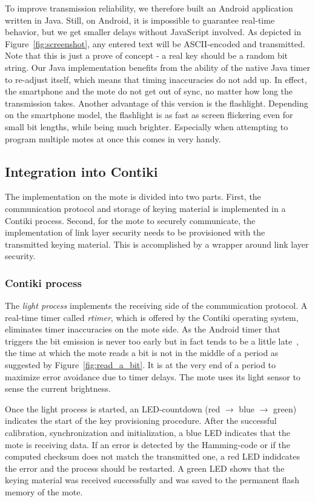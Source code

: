 \documentclass{sig-alternate} %
\begin{document}
To improve transmission reliability, we therefore built an Android application written in Java.
Still, on Android, it is impossible to guarantee real-time behavior, but we get smaller delays without JavaScript involved.
As depicted in Figure~\ref{fig:screenshot}, any entered text will be ASCII-encoded and transmitted.
Note that this is just a prove of concept - a real key should be a random bit string.
Our Java implementation benefits from the ability of the native Java timer to re-adjust itself, which means that timing inaccuracies do not add up.
In effect, the smartphone and the mote do not get out of sync, no matter how long the transmission takes.
Another advantage of this version is the flashlight.
Depending on the smartphone model, the flashlight is as fast as screen flickering even for small bit lengths, while being much brighter.
Especially when attempting to program multiple motes at once this comes in very handy.


\subsection{Integration into Contiki}
\label{sub:mote}

The implementation on the mote is divided into two parts.
First, the communication protocol and storage of keying material is implemented in a Contiki process.
Second, for the mote to securely communicate, the implementation of link layer security needs to be provisioned with the transmitted keying material.
This is accomplished by a wrapper around link layer security.

\subsubsection{Contiki process}
\label{ssub:contiki_process}

The \textit{light process} implements the receiving side of the communication protocol.
A real-time timer called \textit{rtimer}, which is offered by the Contiki operating system, eliminates timer inaccuracies on the mote side.
As the Android timer that triggers the bit emission is never too early but in fact tends to be a little late~\cite{mongia2010reliable}, the time at which the mote reads a bit is not in the middle of a period as suggested by Figure~\ref{fig:read_a_bit}.
It is at the very end of a period to maximize error avoidance due to timer delays.
The mote uses its light sensor to sense the current brightness.

Once the light process is started, an LED-countdown (red $\rightarrow$ blue $\rightarrow$ green) indicates the start of the key provisioning procedure.
After the successful calibration, synchronization and initialization, a blue LED indicates that the mote is receiving data.
If an error is detected by the Hamming-code or if the computed checksum does not match the transmitted one, a red LED indidcates the error and the process should be restarted.
A green LED shows that the keying material was received successfully and was saved to the permanent flash memory of the mote.
\end{document}
